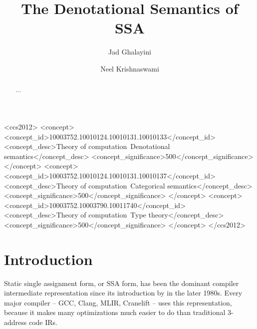 \documentclass[acmsmall,screen,review]{acmart}
\begin{document}
\title{The Denotational Semantics of SSA}

\author{Jad Ghalayini}

\author{Neel Krishnaswami}

\begin{abstract}
  ...
\end{abstract}

\begin{CCSXML}
  <ccs2012>
  <concept>
  <concept_id>10003752.10010124.10010131.10010133</concept_id>
  <concept_desc>Theory of computation~Denotational semantics</concept_desc>
  <concept_significance>500</concept_significance>
  </concept>
  <concept>
  <concept_id>10003752.10010124.10010131.10010137</concept_id>
  <concept_desc>Theory of computation~Categorical semantics</concept_desc>
  <concept_significance>500</concept_significance>
  </concept>
  <concept>
  <concept_id>10003752.10003790.10011740</concept_id>
  <concept_desc>Theory of computation~Type theory</concept_desc>
  <concept_significance>500</concept_significance>
  </concept>
  </ccs2012>
\end{CCSXML}




\maketitle

\section{Introduction}

Static single assignment form, or SSA form, has been the dominant
compiler intermediate representation since its introduction by
\citet{ssa-intro} in the later 1980s. Every major compiler -- GCC, Clang,
MLIR, Cranelift -- uses this representation, because it makes many
optimizations much easier to do than traditional 3-address code IRs.
\end{document}
